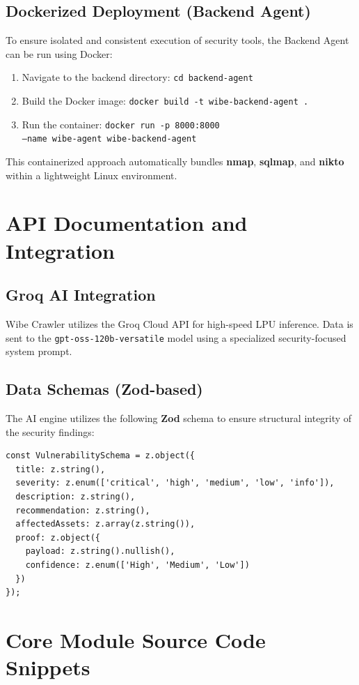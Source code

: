\documentclass[12pt,oneside,a4paper]{book}
\begin{document}
\begin{appendices}
\section{Dockerized Deployment (Backend Agent)}
To ensure isolated and consistent execution of security tools, the Backend Agent can be run using Docker:
\begin{enumerate}
    \item Navigate to the backend directory: \texttt{cd backend-agent}
    \item Build the Docker image: \texttt{docker build -t wibe-backend-agent .}
    \item Run the container: \texttt{docker run -p 8000:8000 \\--name wibe-agent wibe-backend-agent}
\end{enumerate}
This containerized approach automatically bundles \textbf{nmap}, \textbf{sqlmap}, and \textbf{nikto} within a lightweight Linux environment.

\chapter{API Documentation and Integration}
\label{app:api}

\section{Groq AI Integration}
Wibe Crawler utilizes the Groq Cloud API for high-speed LPU inference. Data is sent to the \texttt{gpt-oss-120b-versatile} model using a specialized security-focused system prompt.

\section{Data Schemas (Zod-based)}
The AI engine utilizes the following \textbf{Zod} schema to ensure structural integrity of the security findings:
\begin{verbatim}
const VulnerabilitySchema = z.object({
  title: z.string(),
  severity: z.enum(['critical', 'high', 'medium', 'low', 'info']),
  description: z.string(),
  recommendation: z.string(),
  affectedAssets: z.array(z.string()),
  proof: z.object({
    payload: z.string().nullish(),
    confidence: z.enum(['High', 'Medium', 'Low'])
  })
});
\end{verbatim}

\chapter{Core Module Source Code Snippets}
\label{app:code}


\end{appendices}
\end{document}

